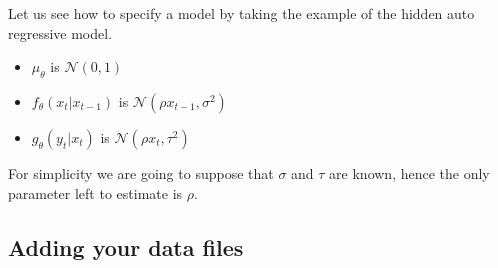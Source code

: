 \documentclass[a4paper,10pt]{paper}
\begin{document}
Let us see how to specify a model by taking the example of the hidden auto regressive model.
\begin{itemize}
 \item $\mu_\theta$ is $\mathcal{N}(0, 1)$
 \item $f_\theta(x_t\vert x_{t-1})$ is $\mathcal{N}(\rho x_{t-1}, \sigma^2)$
 \item $g_\theta(y_t\vert x_t)$ is $\mathcal{N}(\rho x_{t}, \tau^2)$
\end{itemize}
For simplicity we are going to suppose that $\sigma$ and $\tau$ are known, hence the only
parameter left to estimate is $\rho$.



\subsection{Adding your data files}
\end{document}
